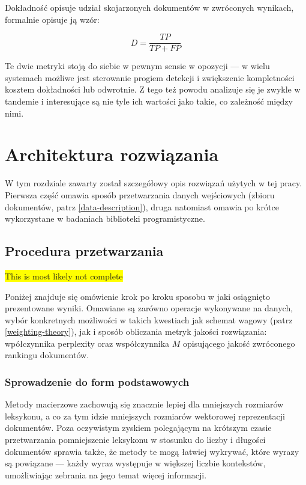 \documentclass[11pt,a4paper]{article}
\newcommand{\todo}[1]{\colorbox{yellow}{#1}}
\begin{document}
Dokładność opisuje udział skojarzonych dokumentów w zwróconych wynikach, formalnie
opisuje ją wzór:

\begin{equation}
  D = \frac{TP}{TP + FP}
\end{equation}

Te dwie metryki stoją do siebie w pewnym sensie w opozycji --- w wielu
systemach możliwe jest sterowanie progiem detekcji i zwiększenie kompletności
kosztem dokładności lub odwrotnie. Z tego też powodu analizuje się je zwykle w
tandemie i interesujące są nie tyle ich wartości jako takie, co zależność
między nimi.

\section{Architektura rozwiązania}

W tym rozdziale zawarty został szczegółowy opis rozwiązań użytych w tej pracy.
Pierwsza część omawia sposób przetwarzania danych wejściowych (zbioru
dokumentów, patrz \ref{data-description}), druga natomiast omawia po krótce
wykorzystane w badaniach biblioteki programistyczne.

\subsection{Procedura przetwarzania}

\todo{This is most likely not complete}

Poniżej znajduje się omówienie krok po kroku sposobu w jaki osiągnięto
prezentowane wyniki. Omawiane są zarówno operacje wykonywane na danych, wybór
konkretnych możliwości w takich kwestiach jak schemat wagowy (patrz
\ref{weighting-theory}), jak i sposób obliczania metryk jakości rozwiązania:
wpółczynnika perplexity oraz współczynnika $M$ opisującego
jakość zwróconego rankingu dokumentów.

\subsubsection{Sprowadzenie do form podstawowych}

Metody macierzowe zachowują się znacznie lepiej dla mniejszych rozmiarów
leksykonu, a co za tym idzie mniejszych rozmiarów wektorowej reprezentacji
dokumentów. Poza oczywistym zyskiem polegającym na krótszym czasie
przetwarzania pomniejszenie leksykonu w stosunku do liczby i długości
dokumentów sprawia także, że metody te mogą łatwiej wykrywać, które wyrazy są
powiązane --- każdy wyraz występuje w większej liczbie kontekstów, umożliwiając
zebrania na jego temat więcej informacji.
\end{document}
